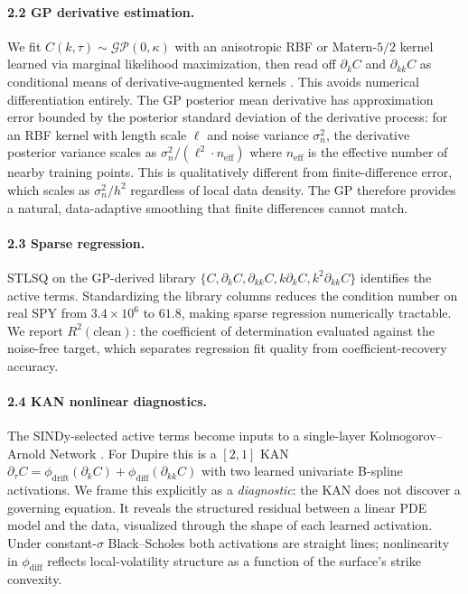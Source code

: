 \documentclass[10pt]{article}
\begin{document}
\paragraph{2.2 GP derivative estimation.} We fit $C(k,\tau)\sim\mathcal{GP}(0,\kappa)$ with an anisotropic RBF or Matern-$5/2$ kernel learned via marginal likelihood maximization, then read off $\partial_k C$ and $\partial_{kk} C$ as conditional means of derivative-augmented kernels \citep{rasmussen2006gp}. This avoids numerical differentiation entirely. The GP posterior mean derivative has approximation error bounded by the posterior standard deviation of the derivative process: for an RBF kernel with length scale $\ell$ and noise variance $\sigma_n^2$, the derivative posterior variance scales as $\sigma_n^2 / (\ell^2 \cdot n_{\text{eff}})$ where $n_{\text{eff}}$ is the effective number of nearby training points. This is qualitatively different from finite-difference error, which scales as $\sigma_n^2 / h^2$ regardless of local data density. The GP therefore provides a natural, data-adaptive smoothing that finite differences cannot match.

\paragraph{2.3 Sparse regression.} STLSQ \citep{brunton2016sindy} on the GP-derived library $\{C,\partial_k C,\partial_{kk}C,k\partial_k C,k^2\partial_{kk}C\}$ identifies the active terms. Standardizing the library columns reduces the condition number on real SPY from $3.4{\times}10^6$ to $61.8$, making sparse regression numerically tractable. We report $R^2(\text{clean})$: the coefficient of determination evaluated against the noise-free target, which separates regression fit quality from coefficient-recovery accuracy.

\paragraph{2.4 KAN nonlinear diagnostics.} The SINDy-selected active terms become inputs to a single-layer Kolmogorov--Arnold Network \citep{liu2025kan}. For Dupire this is a $[2,1]$ KAN $\partial_\tau C = \phi_{\text{drift}}(\partial_k C) + \phi_{\text{diff}}(\partial_{kk} C)$ with two learned univariate B-spline activations. We frame this explicitly as a \emph{diagnostic}: the KAN does not discover a governing equation. It reveals the structured residual between a linear PDE model and the data, visualized through the shape of each learned activation. Under constant-$\sigma$ Black--Scholes both activations are straight lines; nonlinearity in $\phi_{\text{diff}}$ reflects local-volatility structure as a function of the surface's strike convexity.
\end{document}
